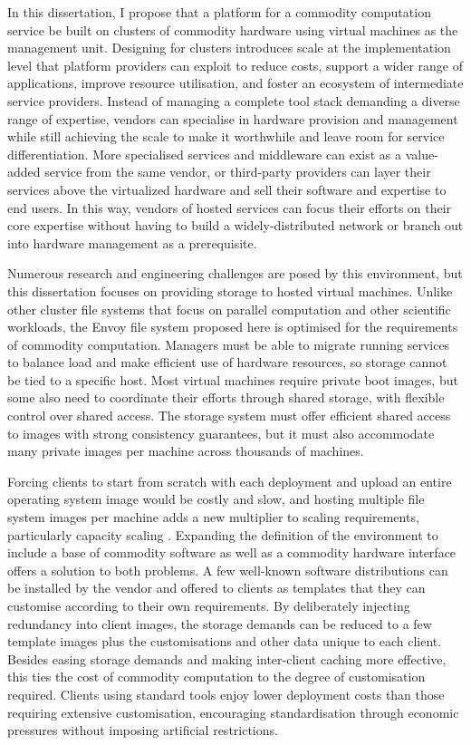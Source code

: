 In this dissertation, I propose that a platform for a commodity computation service be built on clusters of commodity hardware using virtual machines as the management unit. Designing for clusters introduces scale at the implementation level that platform providers can exploit to reduce costs, support a wider range of applications, improve resource utilisation, and foster an ecosystem of intermediate service providers. Instead of managing a complete tool stack demanding a diverse range of expertise, vendors can specialise in hardware provision and management while still achieving the scale to make it worthwhile and leave room for service differentiation. More specialised services and middleware can exist as a value-added service from the same vendor, or third-party providers can layer their services above the virtualized hardware and sell their software and expertise to end users. In this way, vendors of hosted services can focus their efforts on their core expertise without having to build a widely-distributed network or branch out into hardware management as a prerequisite.

Numerous research and engineering challenges are posed by this environment, but this dissertation focuses on providing storage to hosted virtual machines. Unlike other cluster file systems that focus on parallel computation and other scientific workloads, the Envoy file system proposed here is optimised for the requirements of commodity computation. Managers must be able to migrate running services to balance load and make efficient use of hardware resources, so storage cannot be tied to a specific host. Most virtual machines require private boot images, but some also need to coordinate their efforts through shared storage, with flexible control over shared access. The storage system must offer efficient shared access to images with strong consistency guarantees, but it must also accommodate many private images per machine across thousands of machines.

Forcing clients to start from scratch with each deployment and upload an entire operating system image would be costly and slow, and hosting multiple file system images per machine adds a new multiplier to scaling requirements, particularly capacity scaling \cite{warfield}. Expanding the definition of the environment to include a base of commodity software as well as a commodity hardware interface offers a solution to both problems. A few well-known software distributions can be installed by the vendor and offered to clients as templates that they can customise according to their own requirements. By deliberately injecting redundancy into client images, the storage demands can be reduced to a few template images plus the customisations and other data unique to each client. Besides easing storage demands and making inter-client caching more effective, this ties the cost of commodity computation to the degree of customisation required. Clients using standard tools enjoy lower deployment costs than those requiring extensive customisation, encouraging standardisation through economic pressures without imposing artificial restrictions.

